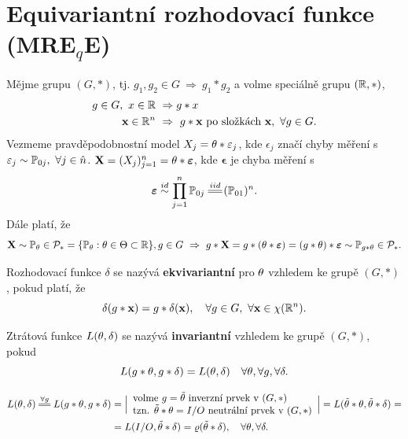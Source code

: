 \section{Equivariantní rozhodovací funkce (MRE$_q$E)}
\begin{define}
	Mějme grupu $(G,\ast)$, tj. $g_1,g_2\in G~\Rightarrow~ g_1\ast g_2$ a volme speciálně grupu $(\mathbb{R},\ast)$, \[
	\begin{split}
	g\in G,~x\in \mathbb{R}&~\Rightarrow g\ast x \\ \textbf{x}\in\mathbb{R}^n&~\Rightarrow~ g\ast \textbf{x}\text{ po složkách }\textbf{x},~\forall g\in G.
	\end{split}
	\]
	Vezmeme pravděpodobnostní model $X_j=\theta\ast \varepsilon_j$, kde $\epsilon_j$ značí chyby měření s $\varepsilon_j\sim \mathbb{P}_{0j},~\forall j\in\hat{n}$. $\textbf{X}=(X_j)_{j=1}^n=\theta\ast\boldsymbol{\varepsilon}$, kde $\boldsymbol{\epsilon}$ je chyba měření s $$\boldsymbol{\epsilon}\stackrel{id}{\sim}\prod_{j=1}^n \PP_{0j}\equal{iid}(\PP_{01})^n.$$
	Dále platí, že $$ \textbf{X}\sim \mathbb{P}_\theta\in\mathcal{P}_\ast=\{\mathbb{P}_\theta:\theta\in\Theta\subset \mathbb{R}\}, g\in G~\Rightarrow~ g\ast \textbf{X}=g\ast(\theta\ast\boldsymbol{\varepsilon})=(g\ast\theta)\ast\boldsymbol{\varepsilon}\sim \mathbb{P}_{g\ast \theta}\in \mathcal{P}_\ast.$$ 
\end{define}
\begin{define}
	Rozhodovací funkce $\delta$ se nazývá \textbf{ekvivariantní} pro $\theta$ vzhledem ke grupě $(G,\ast)$, pokud platí, že $$ \delta(g\ast\textbf{x})=g\ast \delta(\textbf{x}),\quad \forall g\in G,~\forall \textbf{x}\in\chi(\mathbb{R}^n).$$
\end{define}
\begin{define}
	Ztrátová funkce $L(\theta,\delta)$ se nazývá \textbf{invariantní} vzhledem ke grupě $(G,\ast)$, pokud $$ L(g\ast\theta,g\ast\delta)=L(\theta,\delta)\quad\forall \theta,\forall g,\forall \delta.$$
\end{define}
\begin{dusl}
	\[
	\begin{split}
	L(\t,\delta)\equal{\forall g}L(g\ast\t,g\ast \delta)&=\Big| \begin{array}{l}
	\text{volme }g=\tilde{\t}\text{ inverzní prvek v }(G,\ast)\\\text{tzn. }\tilde{\t}\ast\t=I/O\text{ neutrální prvek v }(G,\ast)
	\end{array}
	\Big|=L(\tilde{\t}\ast\t,\tilde{\t}\ast\delta)=\\&=L(I/O,\tilde{\t}\ast\delta)=\rho(\tilde{\t}\ast\delta),\quad\forall\t,\forall\delta.
	\end{split}
	\] 
\end{dusl}
